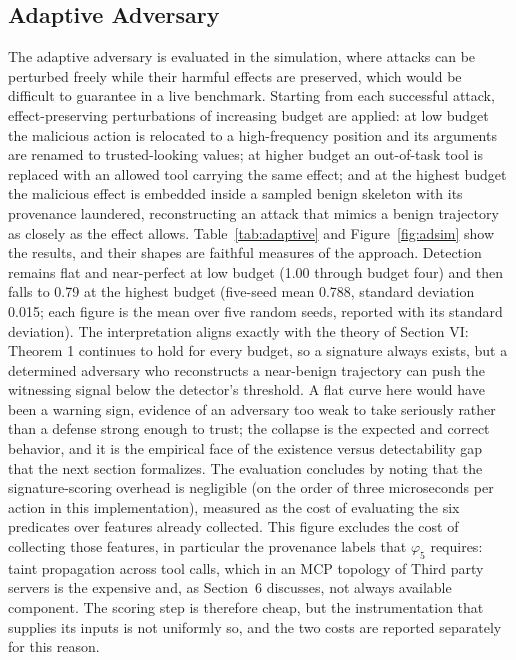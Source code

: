 \documentclass[journal]{IEEEtran}
\theoremstyle{remark}
\begin{document}
\subsection{Adaptive Adversary}
The adaptive adversary is evaluated in the simulation, where attacks can be perturbed freely while their harmful effects are preserved, which would be difficult to guarantee in a live benchmark. Starting from each successful attack, effect-preserving perturbations of increasing budget are applied: at low budget the malicious action is relocated to a high-frequency position and its arguments are renamed to trusted-looking values; at higher budget an out-of-task tool is replaced with an allowed tool carrying the same effect; and at the highest budget the malicious effect is embedded inside a sampled benign skeleton with its provenance laundered, reconstructing an attack that mimics a benign trajectory as closely as the effect allows. Table~\ref{tab:adaptive} and Figure~\ref{fig:adsim} show the results, and their shapes are faithful measures of the approach. Detection remains flat and near-perfect at low budget (1.00 through budget four) and then falls to 0.79 at the highest budget (five-seed mean 0.788, standard deviation 0.015; each figure is the mean over five random seeds, reported with its standard deviation). The interpretation aligns exactly with the theory of Section VI: Theorem 1 continues to hold for every budget, so a signature always exists, but a determined adversary who reconstructs a near-benign trajectory can push the witnessing signal below the detector's threshold. A flat curve here would have been a warning sign, evidence of an adversary too weak to take seriously rather than a defense strong enough to trust; the collapse is the expected and correct behavior, and it is the empirical face of the existence versus detectability gap that the next section formalizes. The evaluation concludes by noting that the signature-scoring overhead is negligible (on the order of three microseconds per action in this implementation), measured as the cost of evaluating the six predicates over features already collected. This figure excludes the cost of collecting those features, in particular the provenance labels that $\varphi_5$ requires: taint propagation across tool calls, which in an MCP topology of Third party servers is the expensive and, as Section~6 discusses, not always available component. The scoring step is therefore cheap, but the instrumentation that supplies its inputs is not uniformly so, and the two costs are reported separately for this reason.
\end{document}
